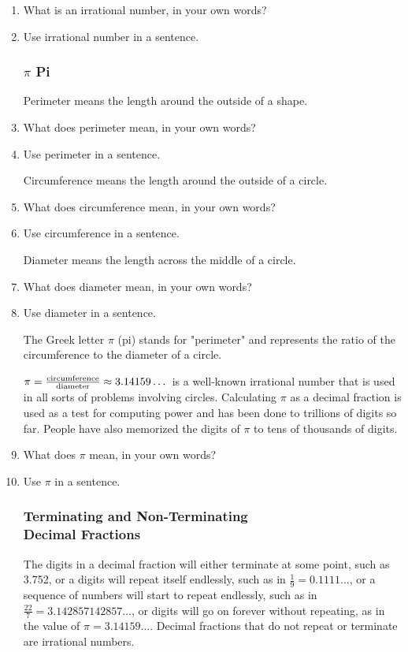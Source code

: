 \documentclass{article}
\begin{document}
\begin{enumerate}
\item What is an irrational number, in your own words?
\item Use irrational number in a sentence.

\subsubsection*{\Large{$\pi$} Pi}
Perimeter means the length around the outside of a shape.
\item What does perimeter mean, in your own words?
\item Use perimeter in a sentence.

Circumference means the length around the outside of a circle.
\item What does circumference mean, in your own words?
\item Use circumference in a sentence.

Diameter means the length across the middle of a circle.
\item What does diameter mean, in your own words?
\item Use diameter in a sentence.

The Greek letter $\pi$ (pi) stands for "perimeter" and represents the ratio of the circumference to the diameter of a circle.

$\Large{\pi} = \frac{\text{circumference}}{\text{diameter}}\approx3.14159\dots$ is a well-known irrational number that is used in all sorts of problems involving circles. Calculating $\pi$ as a decimal fraction is used as a test for computing power and has been done to trillions of digits so far. People have also memorized the digits of $\pi$ to tens of thousands of digits.

\item What does $\pi$ mean, in your own words?
\item Use $\pi$ in a sentence.

\subsubsection*{Terminating and Non-Terminating\\Decimal Fractions}

The digits in a decimal fraction will either terminate at some point, such as 3.752, or a digits will repeat itself endlessly, such as in $\frac{1}{9}=0.1111\dots$, or a sequence of numbers will start to repeat endlessly, such as in $\frac{22}{7}=3.142857142857\dots$, or digits will go on forever without repeating, as in the value of $\pi = 3.14159\dots$. Decimal fractions that do not repeat or terminate are irrational numbers.\\


\end{enumerate}
\end{document}
